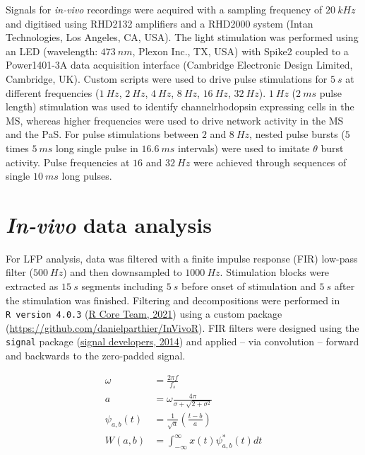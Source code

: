 \documentclass[
  12pt,
  a4paper,
  openany]{book}
\begin{document}
Signals for \emph{in-vivo} recordings were acquired with a sampling frequency of \(20\ kHz\) and digitised using RHD2132 amplifiers and a RHD2000 system (Intan Technologies, Los Angeles, CA, USA). The light stimulation was performed using an LED (wavelength: \(473\ nm\), Plexon Inc., TX, USA) with Spike2 coupled to a Power1401-3A data acquisition interface (Cambridge Electronic Design Limited, Cambridge, UK). Custom scripts were used to drive pulse stimulations for \(5\ s\) at different frequencies (\(1\ Hz\), \(2\ Hz\), \(4\ Hz\), \(8\ Hz\), \(16\ Hz\), \(32\ Hz\)). \(1\ Hz\) (\(2\ ms\) pulse length) stimulation was used to identify channelrhodopsin expressing cells in the MS, whereas higher frequencies were used to drive network activity in the MS and the PaS. For pulse stimulations between \(2\) and \(8\ Hz\), nested pulse bursts (\(5\) times \(5\ ms\) long single pulse in \(16.6\ ms\) intervals) were used to imitate \(\theta\) burst activity. Pulse frequencies at \(16\) and \(32\ Hz\) were achieved through sequences of single \(10\ ms\) long pulses.

\hypertarget{in-vivo-data-analysis}{%
\section{\texorpdfstring{\emph{In-vivo} data analysis}{In-vivo data analysis}}\label{in-vivo-data-analysis}}

For LFP analysis, data was filtered with a finite impulse response (FIR) low-pass filter (\(500\ Hz\)) and then downsampled to \(1000\ Hz\). Stimulation blocks were extracted as \(15\ s\) segments including \(5\ s\) before onset of stimulation and \(5\ s\) after the stimulation was finished. Filtering and decompositions were performed in \texttt{R\ version\ 4.0.3} (\protect\hyperlink{ref-R-base}{R Core Team, 2021}) using a custom package (\url{https://github.com/danielparthier/InVivoR}). FIR filters were designed using the \texttt{signal} package (\protect\hyperlink{ref-signal_developers_signal_2014}{signal developers, 2014}) and applied -- via convolution -- forward and backwards to the zero-padded signal.

\begin{align}
\omega &= \frac{2\pi f}{f_{s}} \label{eq:angular} \\
a &= \omega \frac {4\pi}{\sigma+\sqrt{2+\sigma^{2}}} \label{eq:scale} \\
\psi_{a,b}(t) &= \frac{1}{\sqrt{a}}(\frac{t-b}{a}) \label{eq:Wavelet} \\
W(a,b) &= \int_{-\infty}^{\infty} x(t)\psi_{a,b}^*(t)dt \label{eq:WT}
\end{align}
\end{document}
